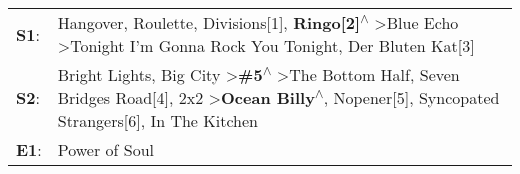 \begin{supertabular}{p{0.03\textwidth}p{0.92\textwidth}}
 \textbf{S1}:  &                                                                                                                    Hangover\textsuperscript{}, \enspace Roulette\textsuperscript{}, \enspace Divisions[1]\textsuperscript{}, \enspace \textbf{Ringo[2]\textsuperscript{$\wedge$}} \textgreater \enspace Blue Echo\textsuperscript{} \textgreater \enspace Tonight I'm Gonna Rock You Tonight\textsuperscript{}, \enspace Der Bluten Kat[3]\textsuperscript{}  \enspace  \\
 \textbf{S2}:  &  Bright Lights, Big City\textsuperscript{} \textgreater \enspace \textbf{\#5\textsuperscript{$\wedge$}} \textgreater \enspace The Bottom Half\textsuperscript{}, \enspace Seven Bridges Road[4]\textsuperscript{}, \enspace 2x2\textsuperscript{} \textgreater \enspace \textbf{Ocean Billy\textsuperscript{$\wedge$}}, \enspace Nopener[5]\textsuperscript{}, \enspace Syncopated Strangers[6]\textsuperscript{}, \enspace In The Kitchen\textsuperscript{}  \enspace  \\
 \textbf{E1}:  &                                                                                                                                                                                                                                                                                                                                                                                                                              Power of Soul\textsuperscript{}  \enspace  \\
\end{supertabular}
